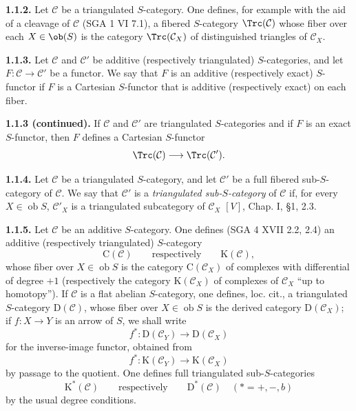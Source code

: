 \textbf{1.1.2.} Let \(\mathcal C\) be a triangulated \(S\)-category. One defines, for example with the aid of a cleavage of \(\mathcal C\) (SGA 1 VI 7.1), a fibered \(S\)-category \(\Trc(\mathcal C)\) whose fiber over each \(X\in \ob(S)\) is the category \(\Trc(\mathcal C_X)\) of distinguished triangles of \(\mathcal C_X\).

\textbf{1.1.3.} Let \(\mathcal C\) and \(\mathcal C'\) be additive (respectively triangulated) \(S\)-categories, and let \(F:\mathcal C\to\mathcal C'\) be a functor. We say that \(F\) is an additive (respectively exact) \(S\)-functor if \(F\) is a Cartesian \(S\)-functor that is additive (respectively exact) on each fiber.



\providecommand{\cC}{\mathcal C}
\providecommand{\cD}{\mathcal D}
\providecommand{\cK}{\mathcal K}
\providecommand{\cO}{\mathcal O}
\providecommand{\cS}{\mathcal S}
\providecommand{\Cpx}{\mathrm C}
\providecommand{\Kpx}{\mathrm K}
\providecommand{\Dpx}{\mathrm D}
\providecommand{\D}{\mathrm D}
\providecommand{\Ho}{\mathrm H}
\providecommand{\RHom}{\mathrm R\!\operatorname{Hom}}
\providecommand{\Ob}{\operatorname{ob}}
\providecommand{\Coker}{\operatorname{Coker}}
\providecommand{\Ker}{\operatorname{Ker}}
\providecommand{\Im}{\operatorname{Im}}
\providecommand{\Hom}{\operatorname{Hom}}
\providecommand{\Cone}{\operatorname{Cone}}
\providecommand{\id}{\operatorname{Id}}
\providecommand{\qis}{\xrightarrow{\sim}}


\textbf{1.1.3 (continued).} If \(\mathcal C\) and \(\mathcal C'\) are triangulated \(S\)-categories and if \(F\) is an exact \(S\)-functor, then \(F\) defines a Cartesian \(S\)-functor
\[
  \Trc(\mathcal C)\longrightarrow \Trc(\mathcal C').
\]

\textbf{1.1.4.} Let \(\mathcal C\) be a triangulated \(S\)-category, and let \(\mathcal C'\) be a full fibered sub-\(S\)-category of \(\mathcal C\). We say that \(\mathcal C'\) is a \emph{triangulated sub-\(S\)-category} of \(\mathcal C\) if, for every \(X\in\Ob S\), \(\mathcal C'_X\) is a triangulated subcategory of \(\mathcal C_X\) \([V]\), Chap. I, §1, 2.3.

\textbf{1.1.5.} Let \(\mathcal C\) be an additive \(S\)-category. One defines (SGA 4 XVII 2.2, 2.4) an additive (respectively triangulated) \(S\)-category
\[
  \Cpx(\mathcal C)\qquad\text{respectively}\qquad \Kpx(\mathcal C),
\]
whose fiber over \(X\in\Ob S\) is the category \(\Cpx(\mathcal C_X)\) of complexes with differential of degree \(+1\) (respectively the category \(\Kpx(\mathcal C_X)\) of complexes of \(\mathcal C_X\) ``up to homotopy''). If \(\mathcal C\) is a flat abelian \(S\)-category, one defines, loc. cit., a triangulated \(S\)-category \(\Dpx(\mathcal C)\), whose fiber over \(X\in\Ob S\) is the derived category \(\Dpx(\mathcal C_X)\); if \(f:X\to Y\) is an arrow of \(S\), we shall write
\[
  f^*:\Dpx(\mathcal C_Y)\longrightarrow \Dpx(\mathcal C_X)
\]
for the inverse-image functor, obtained from
\[
  f^*:\Kpx(\mathcal C_Y)\longrightarrow \Kpx(\mathcal C_X)
\]
by passage to the quotient. One defines full triangulated sub-\(S\)-categories
\[
  \Kpx^*(\mathcal C)\qquad\text{respectively}\qquad \Dpx^*(\mathcal C)
  \quad (*=+,-,b)
\]
by the usual degree conditions.

